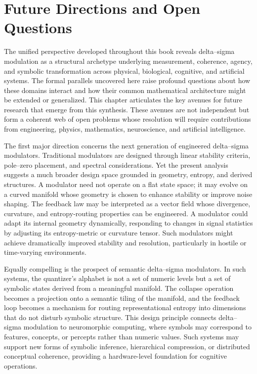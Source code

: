 
\chapter{Future Directions and Open Questions}

The unified perspective developed throughout this book reveals delta–sigma modulation as a structural archetype underlying measurement, coherence, agency, and symbolic transformation across physical, biological, cognitive, and artificial systems. The formal parallels uncovered here raise profound questions about how these domains interact and how their common mathematical architecture might be extended or generalized. This chapter articulates the key avenues for future research that emerge from this synthesis. These avenues are not independent but form a coherent web of open problems whose resolution will require contributions from engineering, physics, mathematics, neuroscience, and artificial intelligence.

The first major direction concerns the next generation of engineered delta–sigma modulators. Traditional modulators are designed through linear stability criteria, pole–zero placement, and spectral considerations. Yet the present analysis suggests a much broader design space grounded in geometry, entropy, and derived structures. A modulator need not operate on a flat state space; it may evolve on a curved manifold whose geometry is chosen to enhance stability or improve noise shaping. The feedback law may be interpreted as a vector field whose divergence, curvature, and entropy-routing properties can be engineered. A modulator could adapt its internal geometry dynamically, responding to changes in signal statistics by adjusting its entropy-metric or curvature tensor. Such modulators might achieve dramatically improved stability and resolution, particularly in hostile or time-varying environments.

Equally compelling is the prospect of semantic delta–sigma modulators. In such systems, the quantizer’s alphabet is not a set of numeric levels but a set of symbolic states derived from a meaningful manifold. The collapse operation becomes a projection onto a semantic tiling of the manifold, and the feedback loop becomes a mechanism for routing representational entropy into dimensions that do not disturb symbolic structure. This design principle connects delta–sigma modulation to neuromorphic computing, where symbols may correspond to features, concepts, or percepts rather than numeric values. Such systems may support new forms of symbolic inference, hierarchical compression, or distributed conceptual coherence, providing a hardware-level foundation for cognitive operations.

